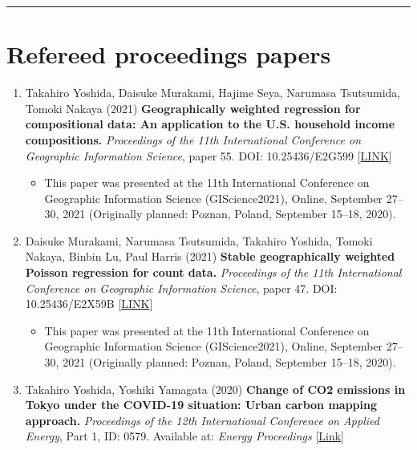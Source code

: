 \documentclass[]{book}
\providecommand{\tightlist}{%
  \setlength{\itemsep}{0pt}\setlength{\parskip}{0pt}}
\begin{document}
\begin{center}\rule{0.5\linewidth}{0.5pt}\end{center}

\hypertarget{refereed-proceedings-papers}{%
\section*{Refereed proceedings papers}\label{refereed-proceedings-papers}}

\begin{enumerate}
\def\labelenumi{\arabic{enumi}.}
\tightlist
\item
  Takahiro Yoshida, Daisuke Murakami, Hajime Seya, Narumasa Tsutsumida, Tomoki Nakaya (2021)
  \textbf{Geographically weighted regression for compositional data: An application to the U.S. household income compositions.}
  \emph{Proceedings of the 11th International Conference on Geographic Information Science}, paper 55.
  DOI: 10.25436/E2G599 {[}\href{https://escholarship.org/uc/item/62s7n79k}{LINK}{]}

  \begin{itemize}
  \tightlist
  \item
    This paper was presented at the 11th International Conference on Geographic Information Science (GIScience2021), Online, September 27--30, 2021 (Originally planned: Poznan, Poland, September 15--18, 2020).
  \end{itemize}
\item
  Daisuke Murakami, Narumasa Tsutsumida, Takahiro Yoshida, Tomoki Nakaya, Binbin Lu, Paul Harris (2021)
  \textbf{Stable geographically weighted Poisson regression for count data.}
  \emph{Proceedings of the 11th International Conference on Geographic Information Science}, paper 47.
  DOI: 10.25436/E2X59B {[}\href{https://escholarship.org/uc/item/8kg664zg}{LINK}{]}

  \begin{itemize}
  \tightlist
  \item
    This paper was presented at the 11th International Conference on Geographic Information Science (GIScience2021), Online, September 27--30, 2021 (Originally planned: Poznan, Poland, September 15--18, 2020).
  \end{itemize}
\item
  Takahiro Yoshida, Yoshiki Yamagata (2020)
  \textbf{Change of CO2 emissions in Tokyo under the COVID-19 situation: Urban carbon mapping approach.}
  \emph{Proceedings of the 12th International Conference on Applied Energy}, Part 1, ID: 0579.
  Available at: \emph{Energy Proceedings} {[}\href{https://www.energy-proceedings.org/change-of-co2-emissions-in-tokyo-under-the-covid-19-situation\%252525252525252525252525252525252525252525252525252525252525252525253A-urban-carbon-mapping-approach/}{Link}{]}


\end{enumerate}
\end{document}
